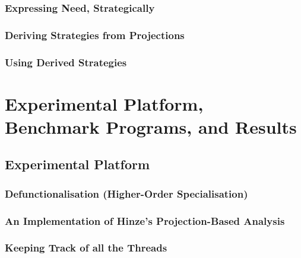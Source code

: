 \documentclass[openright, dottedtoc, headinclude, footinclude=true, a4paper, numbers=noenddot]{scrreprt}
\begin{document}
        \section{Expressing Need, Strategically}
        \label{sec:expressingNeed}
        

        \section{Deriving Strategies from Projections}
        \label{sec:derivation}
        


        \section{Using Derived Strategies}
        \label{sec:parPlacement}
        
    
    
\part{Experimental Platform, Benchmark Programs, and Results}
\label{part:implementation}

    \chapter{Experimental Platform} 
    \label{chap:platform}
    
    
        \section{Defunctionalisation (Higher-Order Specialisation)}
        \label{sec:defunctionalisation}
        
    
        \section{An Implementation of Hinze's Projection-Based Analysis}
        \label{sec:hinzeImplementation}
        
        \section{Keeping Track of all the Threads}
        \label{sec:logging}
        
    
\end{document}
